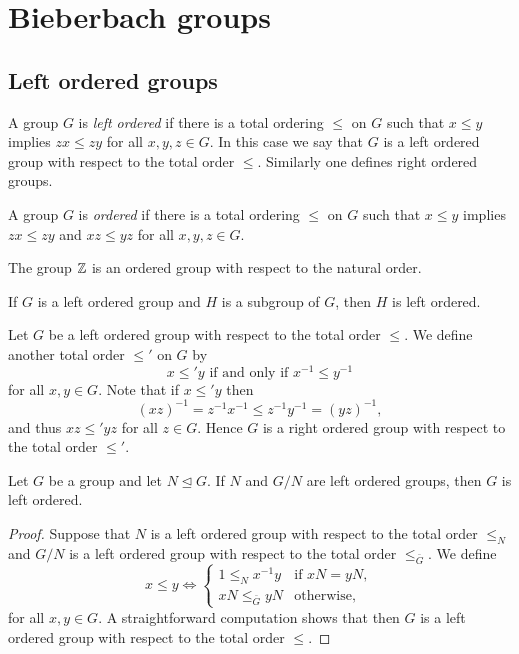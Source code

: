 \chapter{Bieberbach groups}
\label{Bieberbach}


\section{Left ordered groups}


A group $G$ is {\em left ordered} if there is a total ordering $\leq$ on $G$ 
such that $x\leq y$ implies $zx\leq zy$ for all $x,y,z\in G$. In this case we say that $G$ is a left ordered group with respect to the total order $\leq$. Similarly one
defines right ordered groups. 

A group $G$ is {\em ordered} if there is a total ordering $\leq$ on $G$ 
such that $x\leq y$ implies $zx\leq zy$ and $xz\leq yz$ for all $x,y,z\in G$.

\begin{example}
The group $\mathbb{Z}$ is an ordered group with respect to the natural order. 
\end{example}

\begin{example}
	If $G$ is a left ordered group and $H$ is a subgroup of $G$, then $H$ is left ordered.
\end{example}

\begin{remark}
Let $G$ be a left ordered group with respect to the total order $\leq$. We define another total order $\leq'$ on $G$ by
\[ x\leq' y\text{ if and only if }x^{-1}\leq y^{-1}\]
for all $x,y\in G$. Note that if $x\leq' y$ then
\[ (xz)^{-1}=z^{-1}x^{-1}\leq z^{-1}y^{-1}=(yz)^{-1},\]
and thus $xz\leq' yz$ for all $z\in G$. Hence $G$ is a right ordered group with respect to the total order $\leq'$.
\end{remark}

\begin{proposition}\label{prop:LOgroup1}
Let $G$ be a group and let $N\unlhd G$. If $N$ and $G/N$ are left ordered groups, then $G$ is left ordered. 
\end{proposition}

\begin{proof}
Suppose that $N$ is a left ordered group with respect to the total order $\leq_N$ and $G/N$ is a left ordered group with respect to the total order $\leq_{\bar G}$.	We define 
	\[
	x\leq y\Longleftrightarrow
	\begin{cases}
		1\leq_N x^{-1}y & \text{if $xN=yN$},\\
		xN\leq_{\bar G}yN & \text{otherwise},		
	\end{cases}
	\]
for all $x,y\in G$.	A straightforward computation shows that then $G$ is a left ordered group with respect to the total order $\leq$. 
\end{proof}

